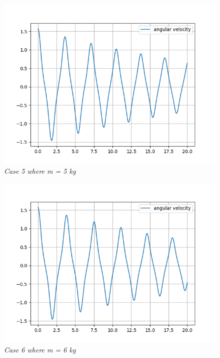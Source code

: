         \begin{figure}[H]
            \centering
            \includegraphics{Appendix/RSimPictures/A/am5.png}
            \caption{\textit{Case 5 where m = 5 kg}}
            \label{}
        \end{figure}
            
        \begin{figure}[H]
            \centering
            \includegraphics{Appendix/RSimPictures/A/am6.png}
            \caption{\textit{Case 6 where m = 6 kg}}
            \label{}
        \end{figure}
            
